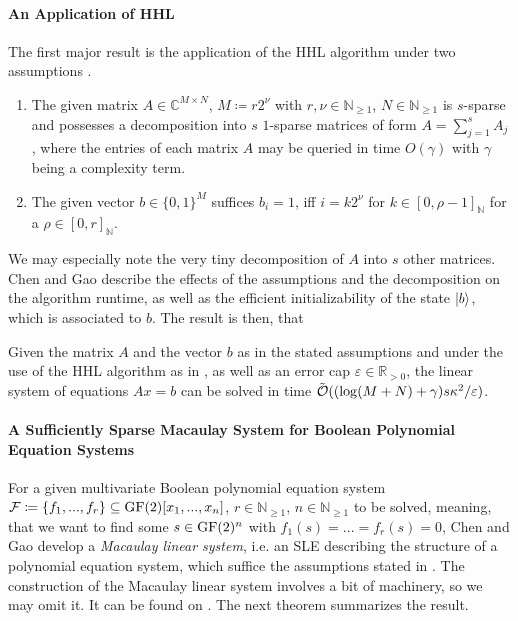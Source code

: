 \paragraph*{An Application of HHL} \label{chen_and_gao_an_application_of_hhl} The first major result is the application of the HHL algorithm under two assumptions \cite[pp. 6-8]{Chen2017}.
\begin{enumerate}[label=\Roman*.]
    \item \label{chen_gao_assumption_1} The given matrix \(A \in \mathbb{C}^{M \times N}\), \(M \coloneqq r2^\nu\) with \(r, \nu \in \mathbb{N}_{\geq 1}\), \(N \in \mathbb{N}_{\geq 1}\) is \(s\)-sparse and possesses a decomposition into \(s\) \(1\)-sparse matrices of form \(A = \sum_{j=1}^s A_j\), where the entries of each matrix \(A\) may be queried in time \(O(\gamma)\) with \(\gamma\) being a complexity term.
    \item \label{chen_gao_assumption_2} The given vector \(b \in \{0, 1\}^M\) suffices \(b_i = 1\), iff \(i = k2^\nu\) for \(k \in [0, \rho - 1]_{\mathbb{N}}\) for a \(\rho \in [0, r]_{\mathbb{N}}\).
\end{enumerate}
We may especially note the very tiny decomposition of \(A\) into \(s\) other matrices. Chen and Gao describe the effects of the assumptions and the decomposition on the algorithm runtime, as well as the efficient initializability of the state \(\ket{b}\), which is associated to \(b\). The result is then, that
\begin{theorem}
    Given the matrix \(A\) and the vector \(b\) as in the stated assumptions and under the use of the HHL algorithm as in , as well as an error cap \(\varepsilon \in \mathbb{R}_{> 0}\), the linear system of equations \(Ax = b\) can be solved in time \(\tilde{\operatorname{\mathcal{O}}}((\log(M+N)+\gamma)s\kappa^2/\varepsilon)\).
\end{theorem}

\paragraph*{A Sufficiently Sparse Macaulay System for Boolean Polynomial Equation Systems} For a given multivariate Boolean polynomial equation system \(\mathcal{F} \coloneqq \{f_1, ..., f_r\} \subseteq \operatorname{GF}(2)[x_1, ..., x_n]\), \(r \in \mathbb{N}_{\geq 1}\), \(n \in \mathbb{N}_{\geq 1}\) to be solved, meaning, that we want to find some \(s \in \operatorname{GF}(2)^n\) with \(f_1(s) = ... = f_r(s) = 0\), Chen and Gao develop a \emph{Macaulay linear system}, i.e. an SLE describing the structure of a polynomial equation system, which suffice the assumptions stated in . The construction of the Macaulay linear system involves a bit of machinery, so we may omit it. It can be found on \cite[pp. 8-11]{Chen2017}. The next theorem summarizes the result.

